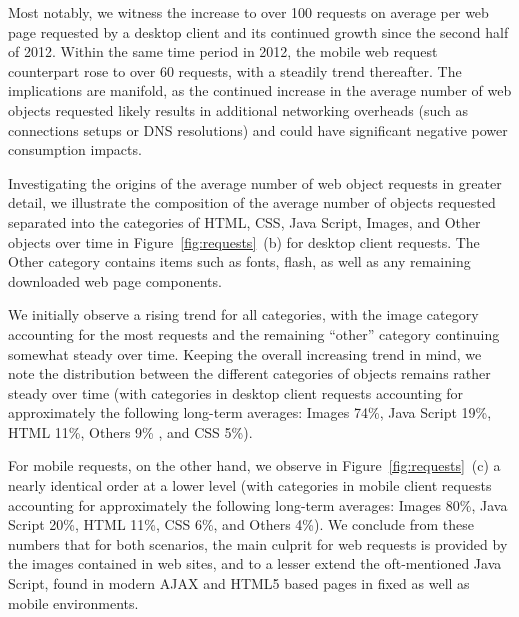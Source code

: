 \documentclass[onecolumn,12pt]{IEEEtran}
\begin{document}
Most notably, we witness the increase to over 100 requests on average per web page requested by a desktop client and its continued growth since the second half of 2012.
Within the same time period in 2012, the mobile web request counterpart rose to over 60 requests, with a steadily trend thereafter. 
The implications are manifold, as the continued increase in the average number of web objects requested likely results in additional networking overheads (such as connections setups or DNS resolutions) and could have significant negative power consumption impacts.


Investigating the origins of the average number of web object requests in greater detail, we illustrate the composition of the average number of objects requested separated into the categories of HTML, CSS, Java Script, Images, and Other objects over time in Figure~\ref{fig:requests}~(b) for desktop client requests.
The Other category contains items such as fonts, flash, as well as any remaining downloaded web page components.

We initially observe a rising trend for all categories, with the image category accounting for the most requests and the remaining ``other'' category continuing somewhat steady over time.
Keeping the overall increasing trend in mind, we note the distribution between the different categories of objects remains rather steady over time (with categories in desktop client requests accounting for approximately the following long-term averages: Images 74\%, Java Script 19\%, HTML 11\%, Others 9\% , and CSS 5\%).

For mobile requests, on the other hand, we observe in Figure~\ref{fig:requests}~(c) a nearly identical order at a lower level (with categories in mobile client requests accounting for approximately the following long-term averages: Images 80\%, Java Script 20\%, HTML 11\%, CSS 6\%, and Others 4\%).
We conclude from these numbers that for both scenarios, the main culprit for web requests is provided by the images contained in web sites, and to a lesser extend the oft-mentioned Java Script, found in modern AJAX and HTML5 based pages in fixed as well as mobile environments.
\end{document}
